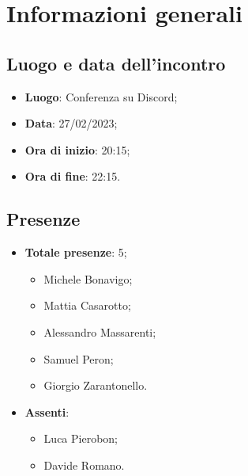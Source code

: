 \section{Informazioni generali}

    \subsection{Luogo e data dell'incontro}
    \begin{itemize}
        \item \textbf{Luogo}: Conferenza su Discord;
        \item \textbf{Data}: 27/02/2023;
        \item \textbf{Ora di inizio}: 20:15;
        \item \textbf{Ora di fine}: 22:15.
    \end{itemize}
    \subsection{Presenze}
    \begin{itemize}
        \item \textbf{Totale presenze}: 5;
        \begin{itemize}
            \item Michele Bonavigo;
            \item Mattia Casarotto;
            \item Alessandro Massarenti;
            \item Samuel Peron;
            \item Giorgio Zarantonello.
        \end{itemize}
        \item \textbf{Assenti}:
        \begin{itemize}
            \item Luca Pierobon;
            \item Davide Romano.
        \end{itemize}
    \end{itemize}